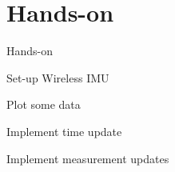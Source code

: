 \documentclass[presentation,aspectratio=169]{beamer}
\begin{document}
\section{Hands-on}
\label{sec-5}
\begin{frame}[label=sec-5-1]{Hands-on}
\begin{block}{Set-up Wireless IMU}
\end{block}
\begin{block}{Plot some data}
\end{block}
\begin{block}{Implement time update}
\end{block}
\begin{block}{Implement measurement updates}
\end{block}
\end{frame}
\end{document}

